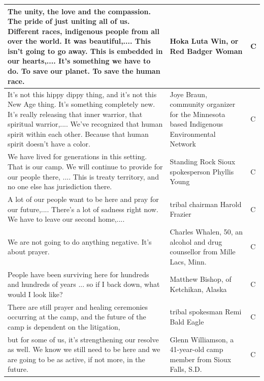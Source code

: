 \begin{footnotesize}
\begin{spacing}{1}
\begin{longtable}{| p{} | P{.25\textwidth} | p{.07\textwidth}|}
The unity, the love and the compassion. The pride of just uniting all of us. Different races, indigenous people from all over the world. It was beautiful,.... This isn't going to go away. This is embedded in our hearts,.... It's something we have to do. To save our planet. To save the human race.                       & Hoka Luta Win, or Red Badger Woman           & C              \\ \hline
It's not this hippy dippy thing, and it's not this New Age thing. It's something completely new. It's really releasing that inner warrior, that spiritual warrior,.... We've recognized that human spirit within each other. Because that human spirit doesn't have a color.                                                  & Joye Braun, community organizer for the Minnesota based Indigenous Environmental Network                       & C              \\ \hline
We have lived for generations in this setting. That is our camp. We will continue to provide for our people there, .... This is treaty territory, and no one else has jurisdiction there.                                                                   & Standing Rock Sioux spokesperson Phyllis Young                                                                 & C              \\ \hline
A lot of our people want to be here and pray for our future,.... There's a lot of sadness right now. We have to leave our second home,....                                & tribal chairman Harold Frazier               & C              \\ \hline
We are not going to do anything negative. It's about prayer.                                        & Charles Whalen, 50, an alcohol and drug counsellor from Mille Lacs, Minn.                                      & C              \\ \hline
People have been surviving here for hundreds and hundreds of years ... so if I back down, what would I look like?                                                       & Matthew Bishop, of Ketchikan, Alaska         & C              \\ \hline
There are still prayer and healing ceremonies occurring at the camp, and the future of the camp is dependent on the litigation,                                       & tribal spokesman Remi Bald Eagle             & C              \\ \hline
but for some of us, it's strengthening our resolve as well. We know we still need to be here and we are going to be as active, if not more, in the future.            & Glenn Williamson, a 41-year-old camp member from Sioux Falls, S.D.                                             & C              \\ \hline

\end{longtable}
\end{spacing}
\end{footnotesize}

